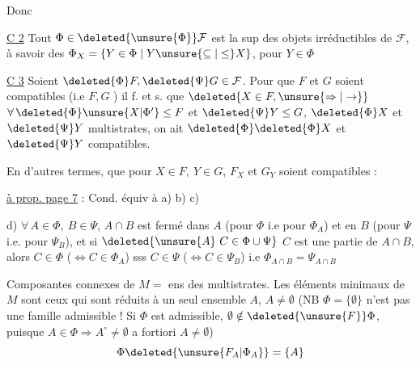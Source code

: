 Donc

\uline{C 2} Tout $\Phi\in\deleted{\unsure{\Phi}}\mathcal F$ est la sup des objets irréductibles de $\mathcal F$, à savoir des $\Phi_{X}=\{Y\in\Phi\mid Y\unsure{\subseteq|\leq}X\}$, pour $Y\in\Phi$

\uline{C 3} Soient $\deleted{\Phi}F,\deleted{\Psi}G\in\mathcal F$. Pour que $F$ et $G$ soient compatibles (i.e $F,G$ ) il f. et s. que $\deleted{X\in F,\unsure{\Rightarrow|\to}}$ $\forall\,\deleted{\Phi}\unsure{X|{\Phi}'}\leq F$ et $\deleted{\Psi}Y\leq G$, $\deleted{\Phi}X$ et $\deleted{\Psi}Y$  multistrates, on ait $\deleted{\Phi}\deleted{\Phi}X$ et $\deleted{\Psi}Y$ compatibles.

En d'autres termes, que pour $X\in F,\ Y\in G$, $F_X$ et $G_Y$ soient compatibles :

\uline{ à prop. page 7} : Cond. équiv à a) b) c)

d)  $\forall\,A\in\Phi,\ B\in\Psi$, $A\cap B$ est fermé dans $A$ (pour $\Phi$ i.e pour $\Phi_A$) et en $B$ (pour $\Psi$ i.e. pour $\Psi_B$), et si $\deleted{\unsure{A}\ C\in\Phi\cup\Psi}$ $C$ est une partie de $A\cap B$, alors $C\in\Phi$ ($\Leftrightarrow C\in\Phi_A$) sss $C\in\Psi$ ($\Leftrightarrow C\in\Psi_B$) i.e $\Phi_{A\cap B}=\Psi_{A\cap B}$

Composantes connexes de $M=$ ens des multistrates. Les éléments minimaux de $M$ sont ceux qui sont réduits à un seul ensemble $A$,  $A\ne\emptyset$ (NB $\Phi=\{\emptyset\}$ n'est pas une famille admissible !\deleted{)} Si $\Phi$ est admissible, $\emptyset\notin\deleted{\unsure{F}}\Phi$, \deleted{)} puisque $A\in\Phi\Rightarrow A^{\circ}\ne\emptyset$ a fortiori $A\ne\emptyset$)
\[
\Phi\deleted{\unsure{F_{A}|\Phi_{A}}}=\{A\}
\]

 

